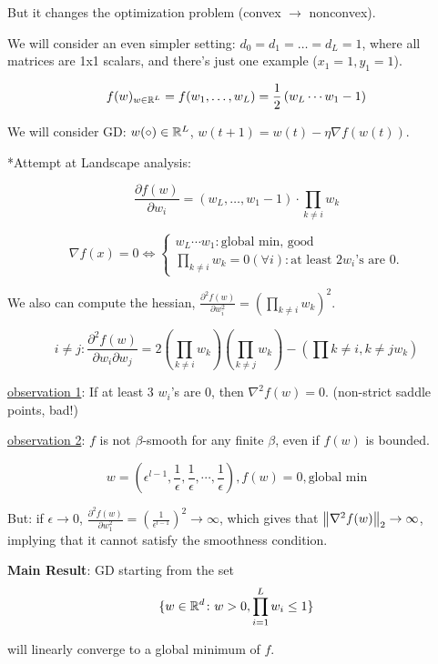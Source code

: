 But it changes the optimization problem (convex \(\to\) nonconvex). 

We will consider an even simpler setting: \(d_0 = d_1 = \ldots = d_L = 1\), where all matrices 
are 1x1 scalars, and there's just one example (\(x_1 = 1, y_1 = 1\)). 

\[
   f(w)_{w \in \mathbb{R}^L}= f(w_1, \ldots, w_L) = \frac{1}{2} \left( w_L \cdots w_1 - 1  \right)
\] 

We will consider GD: \(w (\circ) \in \mathbb{R}^L\), \(w(t+1) = w(t) - \eta \nabla f(w(t))\). 

*Attempt at Landscape analysis: 

\[
    \frac{\partial f(w)}{\partial w_i} = (w_L, \ldots, w_1 - 1) \cdot \prod_{k \neq i} w_k   
\] 

\[
    \nabla f(x) = 0 \Leftrightarrow \begin{cases}
        w_L \cdots w_1 \colon \text{global min, good } \\ 
        \prod_{k \neq i} w_k = 0 (\forall i) \colon \text{at least } 2 w_i\text{'s are }0.  
    \end{cases}
\]

We also can compute the hessian, \(\frac{\partial^2 f(w)}{\partial w_i^2} = \left(\prod_{k \neq i} w_k\right)^2\). 


\[
    i \neq j: \frac{\partial^2 f(w)}{\partial w_i \partial w_j} = 2 \left(\prod_{k \neq i} w_k\right)
    \left(\prod_{k \neq j} w_k\right) - \left( \prod{k \neq i, k \neq j} w_k\right)
\]

\underline{observation 1}: If at least 3 \(w_i\)'s are 0, then \(\nabla^2 f(w) = 0\). 
(non-strict saddle points, bad!)

\underline{observation 2}: \(f\) is not \(\beta\)-smooth for any finite \(\beta\), even if 
\(f(w)\) is bounded. 

\[
    w = \left( \epsilon^{l-1}, \frac{1}{\epsilon}, \frac{1}{\epsilon}, \cdots, 
    \frac{1}{\epsilon} \right), f(w) = 0, \text{global min}
\]

But: if \(\epsilon \to 0\), \(\frac{\partial^2 f(w)}{\partial w_1^2} = \left(\frac{1}{\epsilon^{l-1}}\right)^2 \to \infty\), 
which gives that \(\norm{\nabla^2 f(w)}_2 \to \infty\), implying that it cannot satisfy the 
smoothness condition. 

\textbf{Main Result}: GD starting from the set 
\[
    \{ w \in \mathbb{R}^d \colon w > 0, \prod_{i=1}^L w_i \leq 1 \}
\]

will linearly converge to a global minimum of \(f\). 



